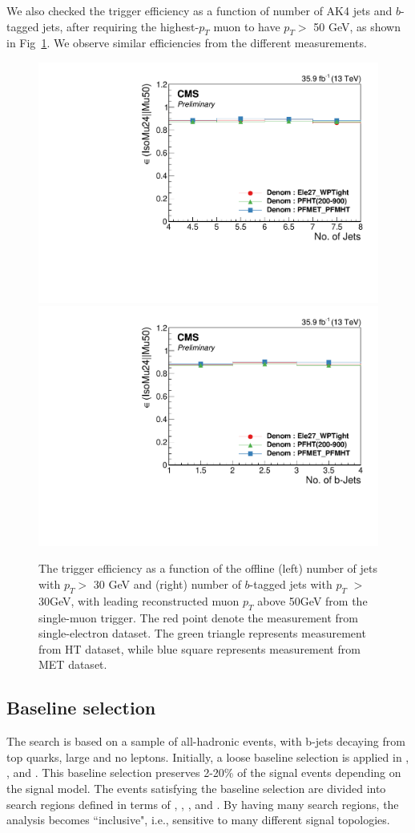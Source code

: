 We also checked the trigger efficiency as a function of number of AK4 jets and $b$-tagged jets, after requiring the highest-$p_{T}$ muon to have $p_{T}>$ 50 GeV, as shown in Fig~\ref{fig:TrigMuonJets}. We observe similar efficiencies from the different measurements.
\begin{figure}[tbp]
 \begin{center}
   \includegraphics[width=0.49\linewidth]{sections/mc4/EvtSelSBOpt/figures/MuonNJets.pdf}
   \includegraphics[width=0.49\linewidth]{sections/mc4/EvtSelSBOpt/figures/MuonNBs.pdf}
   \caption{ The trigger efficiency as a function of the offline (left) number
		 of jets with $p_{T}>$ 30 GeV and (right) number of $b$-tagged jets with $p_{T}$
		 $>$ 30GeV, with leading reconstructed muon $p_{T}$ above 50GeV from the
   single-muon trigger. The red point denote the measurement from
   single-electron dataset. The green triangle represents measurement from HT
   dataset, while blue square represents measurement from MET dataset.}
   \label{fig:TrigMuonJets}
 \end{center}
\end{figure}

\subsection{Baseline selection}
\label{sec:baselineselection}

The search is based on a sample of all-hadronic events, with b-jets decaying from top quarks, large \MET and no leptons. Initially, a loose baseline selection is applied in \MET, \HT, \njets and \nbjets. This baseline selection preserves 2-20\% of the signal events depending on the signal model. The events satisfying the baseline selection are divided into search regions defined in terms of \ntops, \nbjets, \MET, \HT and \MTTwo. By having many search regions, the analysis becomes ``inclusive", i.e., sensitive to many different signal topologies.

